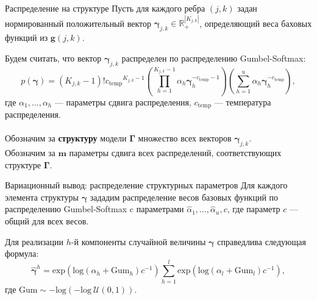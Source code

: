 \documentclass[usenames,dvipsnames,11pt,pdf,utf8,russian,aspectratio=169]{beamer}
\begin{document}
\begin{frame}{ Распределение на структуре}
Пусть для каждого ребра $(j,k)$ задан нормированный положительный вектор $\boldsymbol{\gamma}_{j,k} \in \mathbb{R}_{+}^{|K_{j,k}|}$, определяющий веса баховых функций из  $\mathbf{g}(j,k)$.

Будем считать, что вектор $\boldsymbol{\gamma}_{j,k}$ распределен по распределению Gumbel-Softmax:
\[
    p(\boldsymbol{\gamma}) = (K_{j,k}-1)!{c_{\text{temp}}}^{K_{j,k}-1}\left(\prod_{h=1}^{K_{j,k}-1} \alpha_h \boldsymbol{\gamma}_h^{-c_{\text{temp}}-1}\right)\left(\sum_{h=1}^u\alpha_h\boldsymbol{\gamma}_h^{-c_{\text{temp}}}\right),
\] 
где $\alpha_1,\dots,\alpha_h$ --- параметры сдвига распределения, $c_{\text{temp}}$ --- температура распределения. 
\\~\\
Обозначим за \textbf{структуру} модели $\boldsymbol{\Gamma}$ множество всех векторов $\boldsymbol{\gamma}_{j,k}$.\\
Обозначим за $\mathbf{m}$ параметры сдвига всех распределений, соответствующих структуре $\boldsymbol{\Gamma}$.

\end{frame}




\begin{frame}{Вариационный вывод: распределение структурных параметров}
Для каждого элемента структуры $\boldsymbol{\gamma}$ зададим распределение весов базовых функций по распределению Gumbel-Softmax c параметрами $\hat{\alpha}_1, \dots, \hat{\alpha}_u, c$, где параметр $c$ --- общий для всех весов.

Для реализации $h$-й компоненты случайной величины $\boldsymbol{\gamma}$ справедлива следующая формула:
\[
    \hat{\boldsymbol{\gamma}}^h = \text{exp}\left(\text{log}\left(\alpha_h + \text{Gum}_h\right)c^{-1}\right) \sum_{h=1}^l \text{exp}\left(\text{log}\left(\alpha_l + \text{Gum}_l\right)c^{-1}\right),
\]
где $\text{Gum} \sim -\text{log}(-\text{log}~\mathcal{U}(0,1)).$ 
\end{frame}
\end{document}
